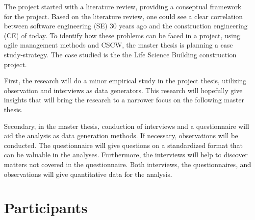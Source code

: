 The project started with a literature review, providing a conseptual framework for the project. Based on the literature review, one could see a clear correlation between software engineering (SE) 30 years ago and the construction engineering (CE) of today. To identify how these problems can be faced in a project, using agile management methods and CSCW, the master thesis is planning a case study-strategy. The case studied is the the Life Science Building construction project. 

First, the research will do a minor empirical study in the project thesis, utilizing observation and interviews as data generators. This research will hopefully give insights that will bring the research to a narrower focus on the following master thesis. 

Secondary, in the master thesis, conduction of interviews and a questionnaire will aid the analysis as data generation methods. If necessary, observations will be conducted. The questionnaire will give questions on a standardized format that can be valuable in the analyses. Furthermore, the interviews will help to discover matters not covered in the questionnaire. Both interviews, the questionnaires, and observations will give quantitative data for the analysis.


\section*{Participants}

